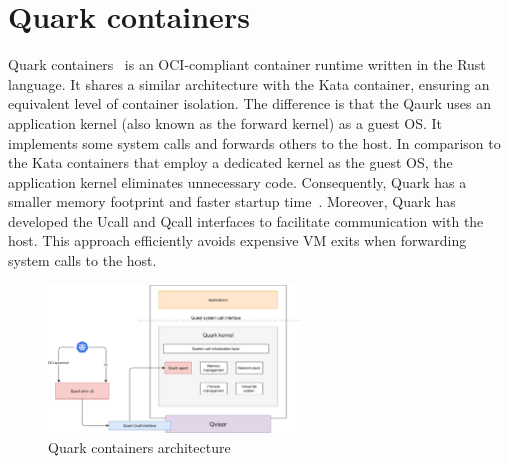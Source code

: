 \section{Quark containers}
\label{sec:Quark}
Quark containers~\cite*{quark} is an OCI-compliant container runtime written in the Rust language. It shares a similar architecture with the Kata container, ensuring an equivalent level of container isolation. 
The difference is that the Qaurk uses an application kernel (also known as the forward kernel) as a guest OS. It implements some system calls and forwards others to the host. In comparison to the Kata containers that employ a dedicated kernel as the guest OS, 
the application kernel eliminates unnecessary code. Consequently, Quark has a smaller memory footprint and faster startup time~\cite*{quark_performance_report}. Moreover, Quark has developed the Ucall and Qcall interfaces to facilitate communication with the host. This approach efficiently avoids expensive VM exits when 
forwarding system calls to the host.

\begin{figure}[htp]
  \centering
  \includegraphics[width=0.6\textwidth]{images/QUARK_ARCH.PNG}
  \caption[Quark containers architecture]{Quark containers architecture}
  \label{fig:QUARK_ARCH}
\end{figure}


